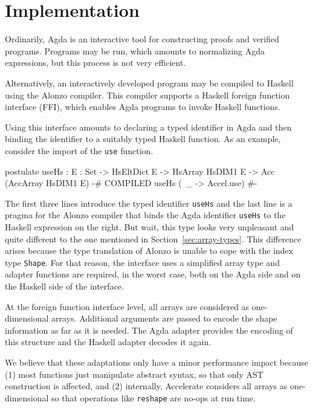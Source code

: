 \documentclass{llncs}
\begin{document}
\section{Implementation}
\label{sec:implementation}

Ordinarily, Agda is an interactive tool for constructing proofs and
verified programs. Programs may be run, which amounts to normalizing
Agda expressions, but this process is not very efficient.

Alternatively, an interactively developed program may be compiled to
Haskell using the Alonzo compiler. This compiler supports a Haskell
foreign function interface (FFI), which enables Agda programs to invoke
Haskell functions. 

Using this interface amounts to declaring a typed identifier in Agda
and then binding the identifier to a suitably typed Haskell
function. As an example, consider the import of the \texttt{use}
function.
\begin{code}
postulate 
  useHs : {E : Set}
      -> HsEltDict E -> HsArray HsDIM1 E -> Acc (AccArray HsDIM1 E)
  {-# COMPILED useHs       (\ _ -> Accel.use) #-}
\end{code}
The first three lines introduce the typed identifier \texttt{useHs}
and the last line is a pragma for the Alonzo compiler that binds the
Agda identifier \texttt{useHs} to the Haskell expression on the right.
But wait, this type looks very unpleasant and quite different to the
one mentioned in Section~\ref{sec:array-types}. This difference arises
because the type translation of Alonzo is unable to cope with the
index type \texttt{Shape}. For that reason, the interface uses a
simplified array type and adapter functions are required, in the worst
case, both on the Agda side and on the Haskell side of the interface.

At the foreign function interface level, all arrays are considered as
one-dimensional arrays. Additional arguments are passed to encode the
shape information as far as it is needed. The Agda adapter provides
the encoding of this structure and the Haskell adapter decodes it again. 

We believe that these adaptations only have a minor performance impact
because (1) most functions just manipulate abstract syntax, so that
only AST construction is affected, and (2) internally, Accelerate
considers all arrays as one-dimensional so that operations like
\texttt{reshape} are no-ops at run time.
\end{document}
